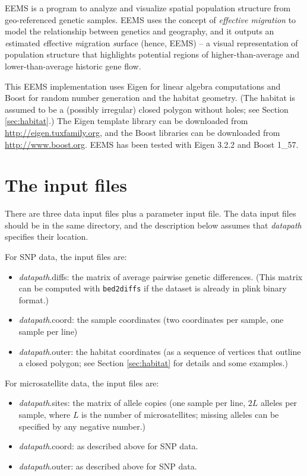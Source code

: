 \documentclass[a4paper,10pt,DIV=15,mpinclude=true]{scrartcl}
\begin{document}
EEMS is a program to analyze and visualize spatial population structure from geo-referenced genetic samples. EEMS uses the concept of \textit{effective migration} to model the relationship between genetics and geography, and it outputs an \textit{e}stimated \textit{e}ffective \textit{m}igration \textit{s}urface (hence, EEMS) -- a visual representation of population structure that highlights potential regions of higher-than-average and lower-than-average historic gene flow.

This EEMS implementation uses Eigen for linear algebra computations and Boost for random number generation and the habitat geometry. (The habitat is assumed to be a (possibly irregular) closed polygon without holes; see Section \ref{sec:habitat}.) The Eigen template library can be downloaded from \url{http://eigen.tuxfamily.org}, and the Boost libraries can be downloaded from \url{http://www.boost.org}. EEMS has been tested with Eigen 3.2.2 and Boost 1\_57.

\section{The input files}

There are three data input files plus a parameter input file. The data input files should be in the same directory, and the description below assumes that \textit{datapath} specifies their location.

For SNP data, the input files are:
\begin{itemize}
  \item \textit{datapath}.diffs: the matrix of average pairwise genetic differences. (This matrix can be computed with {\tt bed2diffs} if the dataset is already in plink binary format.)
  \item \textit{datapath}.coord: the sample coordinates (two coordinates per sample, one sample per line)
  \item \textit{datapath}.outer: the habitat coordinates (as a sequence of vertices that outline a closed polygon; see Section \ref{sec:habitat} for details and some examples.)
\end{itemize}

For microsatellite data, the input files are:
\begin{itemize}
  \item \textit{datapath}.sites: the matrix of allele copies (one sample per line, $2L$ alleles per sample, where $L$ is the number of microsatellites; missing alleles can be specified by any negative number.)
  \item \textit{datapath}.coord: as described above for SNP data.
  \item \textit{datapath}.outer: as described above for SNP data.
\end{itemize}
\end{document}
